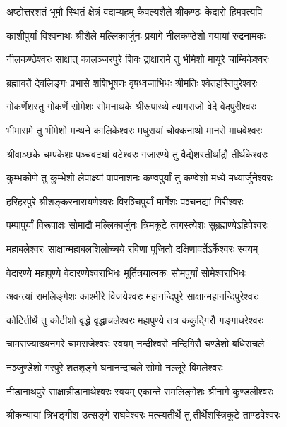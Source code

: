 
\twolineshloka
{अष्टोत्तरशतं भूमौ स्थितं क्षेत्रं वदाम्यहम्}
{कैवल्यशैले श्रीकण्ठः केदारो हिमवत्यपि}

\twolineshloka
{काशीपुर्यां विश्वनाथः श्रीशैले मल्लिकार्जुनः}
{प्रयागे नीलकण्ठेशो गयायां रुद्रनामकः}

\twolineshloka
{नीलकण्ठेश्वरः साक्षात् कालञ्जरपुरे शिवः}
{द्राक्षारामे तु भीमेशो मायूरे चाम्बिकेश्वरः}

\twolineshloka
{ब्रह्मावर्ते देवलिङ्गः प्रभासे शशिभूषणः}
{वृषध्वजाभिधः श्रीमतिः श्वेतहस्तिपुरेश्वरः}

\twolineshloka
{गोकर्णेशस्तु गोकर्णे सोमेशः सोमनाथके}
{श्रीरूपाख्ये त्यागराजो वेदे वेदपुरीश्वरः}

\twolineshloka
{भीमारामे तु भीमेशो मन्थने कालिकेश्वरः}
{मधुरायां चोक्कनाथो मानसे माधवेश्वरः}

\twolineshloka
{श्रीवाञ्छके चम्पकेशः पञ्चवट्यां वटेश्वरः}
{गजारण्ये तु वैद्येशस्तीर्थाद्रौ तीर्थकेश्वरः}

\twolineshloka
{कुम्भकोणे तु कुम्भेशो लेपाक्ष्यां पापनाशनः}
{कण्वपुर्यां तु कण्वेशो मध्ये मध्यार्जुनेश्वरः}

\twolineshloka
{हरिहरपुरे श्रीशङ्करनारायणेश्वरः}
{विरञ्चिपुर्यां मार्गेशः पञ्चनद्यां गिरीश्वरः}

\twolineshloka
{पम्पापुर्यां विरूपाक्षः सोमाद्रौ मल्लिकार्जुनः}
{त्रिमकूटे त्वगस्त्येशः सुब्रह्मण्येऽहिपेश्वरः}

\twolineshloka
{महाबलेश्वरः साक्षान्महाबलशिलोच्चये}
{रविणा पूजितो दक्षिणावर्तेऽर्केश्वरः स्वयम्}

\twolineshloka
{वेदारण्ये महापुण्ये वेदारण्येश्वराभिधः}
{मूर्तित्रयात्मकः सोमपुर्यां सोमेश्वराभिधः}

\twolineshloka
{अवन्त्यां रामलिङ्गेशः काश्मीरे विजयेश्वरः}
{महानन्दिपुरे साक्षान्महानन्दिपुरेश्वरः}

\twolineshloka
{कोटितीर्थे तु कोटीशो वृद्धे वृद्धाचलेश्वरः}
{महापुण्ये तत्र ककुद्गिरौ गङ्गाधरेश्वरः}

\twolineshloka
{चामराज्याख्यनगरे चामराजेश्वरः स्वयम्}
{नन्दीश्वरो नन्दिगिरौ चण्डेशो बधिराचले}

\twolineshloka
{नञ्जुण्डेशो गरपुरे शतशृङ्गे}
{घनानन्दाचले सोमो नल्लूरे विमलेश्वरः}

\twolineshloka
{नीडानाथपुरे साक्षान्नीडानाथेश्वरः स्वयम्}
{एकान्ते रामलिङ्गेशः श्रीनागे कुण्डलीश्वरः}

\twolineshloka
{श्रीकन्यायां त्रिभङ्गीश उत्सङ्गे राघवेश्वरः}
{मत्स्यतीर्थे तु तीर्थेशस्त्रिकूटे ताण्डवेश्वरः}


